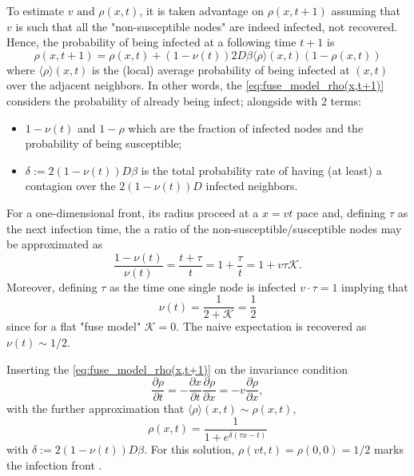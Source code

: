 \documentclass[a4paper,10pt]{book} %
\theoremstyle{definition}
\begin{document}
To estimate $v \text{ and } \rho(x,t)$, it is taken advantage on $\rho(x,t+1)$ assuming that $v$ is such that all the "non-susceptible nodes" are indeed infected, not recovered. Hence, the probability of being infected at a following time $t+1$ is
\begin{equation}
	\rho(x, t+1) = \rho(x,t)+(1-\nu(t))2D \beta \langle \rho \rangle(x,t) (1-\rho(x,t))
	\label{eq:fuse_model_rho(x,t+1)}
\end{equation}  
where $\langle \rho \rangle(x,t)$ is the (local) average probability of being infected at $(x,t)$ over the adjacent neighbors.
In other words, the \autoref{eq:fuse_model_rho(x,t+1)} considers the probability of already being infect; alongside with 2 terms:
\begin{itemize}
	\item $1-\nu(t)$ and $1-\rho$ which are the fraction of infected nodes and the probability of being susceptible;
	\item $\delta:= 2(1-\nu(t))D \beta$ is the total probability rate of having (at least) a contagion over the $2(1-\nu(t))D$ infected neighbors.
\end{itemize}
For a one-dimensional front, its radius proceed at a $x=vt$ pace and, defining $\tau$ as the next infection time, the a ratio of the non-susceptible/susceptible nodes may be approximated as 
\begin{equation*}
	\frac{1-\nu(t)}{\nu(t)} = \frac{t+\tau}{t} = 1+\frac{\tau}{t} = 1+v \tau \mathcal{K}.
\end{equation*}
Moreover, defining $\tau$ as the time one single node is infected $v \cdot \tau = 1$ implying that 
\[ \nu(t) = \frac{1}{2+\mathcal{K}} = \frac{1}{2} \]
since for a flat "fuse model" $\mathcal{K} = 0$. 
The naive expectation is recovered as $\nu(t) \sim 1/2$. 

Inserting the \autoref{eq:fuse_model_rho(x,t+1)} on the invariance condition 
\begin{equation}
	\frac{\partial \rho}{\partial t} = - \frac{\partial x}{\partial t} \frac{\partial \rho}{\partial x} = -v \frac{\partial \rho}{\partial x},
\end{equation}
with the further approximation that $\langle \rho \rangle(x,t) \sim \rho(x,t)$,
\begin{equation}
	\rho(x,t) = \frac{1}{1+e^{\delta(\tau x - t)}}
\end{equation}
with $\delta:= 2(1-\nu(t))D \beta$. 
For this solution, $\rho(vt,t) = \rho(0,0) = 1/2$ marks the infection front \cite{Thurner::Appendix_NetBasedExpl}. 
\end{document}
